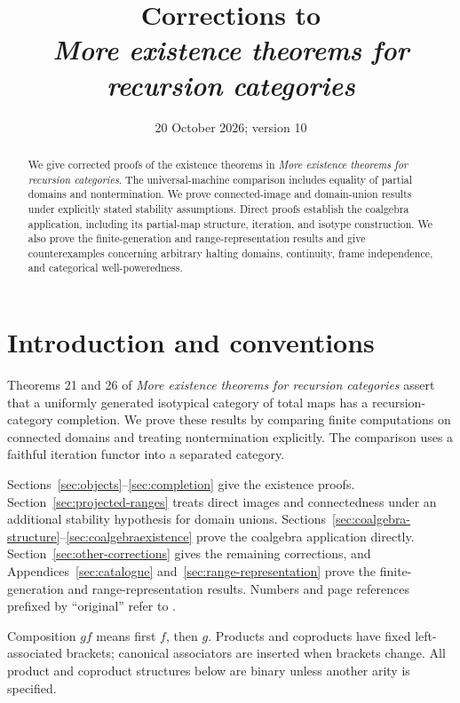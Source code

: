 \documentclass[11pt]{article}
\title{Corrections to\\\emph{More existence theorems for recursion categories}}
\author{}\date{20 October 2026; version 10}
\begin{document}
\maketitle
\begin{abstract}
We give corrected proofs of the existence theorems in \emph{More existence theorems for recursion categories}. The universal-machine comparison includes equality of partial domains and nontermination. We prove connected-image and domain-union results under explicitly stated stability assumptions. Direct proofs establish the coalgebra application, including its partial-map structure, iteration, and isotype construction. We also prove the finite-generation and range-representation results and give counterexamples concerning arbitrary halting domains, continuity, frame independence, and categorical well-poweredness.
\end{abstract}

\section{Introduction and conventions}\label{sec:framework}
Theorems 21 and 26 of \emph{More existence theorems for recursion categories} \cite{L} assert that a uniformly generated isotypical category of total maps has a recursion-category completion. We prove these results by comparing finite computations on connected domains and treating nontermination explicitly. The comparison uses a faithful iteration functor into a separated category.

Sections~\ref{sec:objects}--\ref{sec:completion} give the existence proofs. Section~\ref{sec:projected-ranges} treats direct images and connectedness under an additional stability hypothesis for domain unions. Sections~\ref{sec:coalgebra-structure}--\ref{sec:coalgebraexistence} prove the coalgebra application directly. Section~\ref{sec:other-corrections} gives the remaining corrections, and Appendices~\ref{sec:catalogue} and~\ref{sec:range-representation} prove the finite-generation and range-representation results. Numbers and page references prefixed by ``original'' refer to \cite{L}.

Composition $gf$ means first $f$, then $g$. Products and coproducts
have fixed left-associated brackets; canonical associators are inserted
when brackets change. All product and coproduct structures below are
binary unless another arity is specified.
\end{document}

